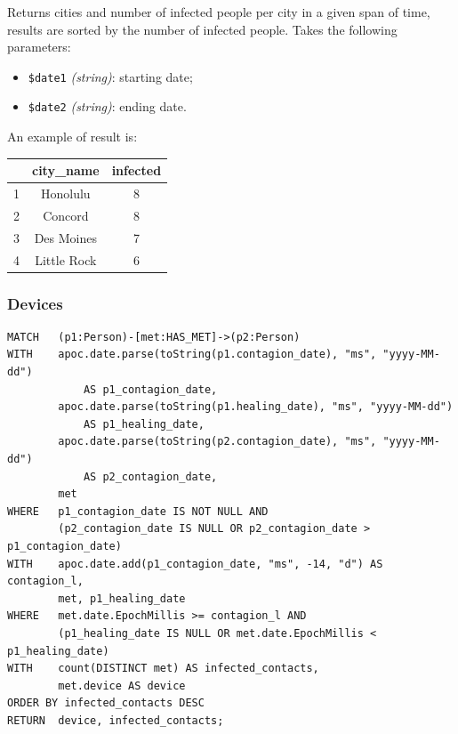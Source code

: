 \documentclass[12pt, a4paper]{article}
\begin{document}
\noindent %
Returns cities and number of infected people per city in a given span of time, 
results are sorted by the number of infected people. 
Takes the following parameters:

\begin{itemize}
    \item \texttt{\$date1} \emph{(string)}: starting date;
    \item \texttt{\$date2} \emph{(string)}: ending date.
\end{itemize}

\noindent %
An example of result is: 
\begin{center}
    \begin{tabular}{ |c|c|c|} 
        \hline
        & city\_name & infected\\
        \hline
        1 & Honolulu & 8 \\
        2 & Concord & 8\\
        3 & Des Moines & 7\\
        4 & Little Rock & 6\\
        \hline
    \end{tabular}
\end{center}

\subsubsection{Devices}

\begin{tcolorbox}[fontupper=\scriptsize]
    \begin{verbatim}
MATCH   (p1:Person)-[met:HAS_MET]->(p2:Person)
WITH    apoc.date.parse(toString(p1.contagion_date), "ms", "yyyy-MM-dd") 
            AS p1_contagion_date,
        apoc.date.parse(toString(p1.healing_date), "ms", "yyyy-MM-dd") 
            AS p1_healing_date,
        apoc.date.parse(toString(p2.contagion_date), "ms", "yyyy-MM-dd") 
            AS p2_contagion_date,
        met
WHERE   p1_contagion_date IS NOT NULL AND
        (p2_contagion_date IS NULL OR p2_contagion_date > p1_contagion_date)
WITH    apoc.date.add(p1_contagion_date, "ms", -14, "d") AS contagion_l,
        met, p1_healing_date
WHERE   met.date.EpochMillis >= contagion_l AND
        (p1_healing_date IS NULL OR met.date.EpochMillis < p1_healing_date)
WITH    count(DISTINCT met) AS infected_contacts, 
        met.device AS device
ORDER BY infected_contacts DESC
RETURN  device, infected_contacts;
    \end{verbatim}
\end{tcolorbox}
\end{document}
